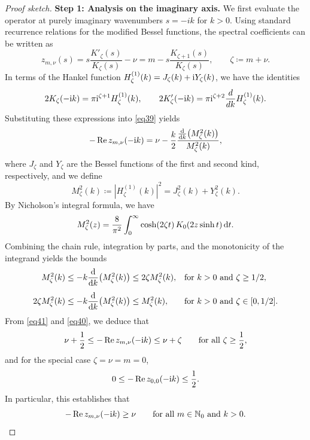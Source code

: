 \documentclass[12pt,reqno]{amsart}
\numberwithin{equation}{section}
\begin{document}
\begin{proof}[Proof sketch]
\smallskip\noindent\textbf{Step 1: Analysis on the imaginary axis.} 
We first evaluate the operator at purely imaginary wavenumbers $s = -ik$ for $k > 0$. Using standard recurrence relations for the modified Bessel functions, the spectral coefficients can be written as
\begin{equation}\label{eq39}
    z_{m,\nu}(s) = s \frac{K'_{\zeta}(s)}{K_{\zeta}(s)} - \nu
    = m - s \frac{K_{\zeta+1}(s)}{K_{\zeta}(s)}, \qquad \zeta \coloneqq m+\nu.
\end{equation}
In terms of the Hankel function $H_\zeta^{(1)}(k) = J_\zeta(k) + {\rm i}Y_\zeta(k)$, we have the identities
\begin{equation*}
    2K_\zeta(-{\rm i}k) = \pi {\rm i}^{\zeta+1} H_\zeta^{(1)}(k), \qquad
    2K'_\zeta(-{\rm i}k) = \pi {\rm i}^{\zeta+2} \frac{d}{dk} H_\zeta^{(1)}(k).
\end{equation*}
Substituting these expressions into \eqref{eq39} yields
\begin{equation}\label{eq41}
    - \operatorname{Re} z_{m,\nu}(- {\rm i}k)
    = \nu - \frac{k}{2} \frac{\frac{{\rm d}}{{\rm d}k} \bigl( M_\zeta^2(k) \bigr)}{M_\zeta^2(k)},
\end{equation}
where $J_\zeta$ and $Y_\zeta$ are the Bessel functions of the first and second kind, respectively, and we define
\begin{equation*}
    M_\zeta^2(k) \coloneqq |H_\zeta^{(1)}(k)|^2 = J_\zeta^2(k) + Y_\zeta^2(k).
\end{equation*}
By Nicholson's integral formula, we have
\begin{equation*}
    M_\zeta^2(z) = \frac{8}{\pi^2} \int_0^\infty \cosh(2\zeta t) \, K_0(2z\sinh t) \, {\rm d}t.
\end{equation*}
Combining the chain rule, integration by parts, and the monotonicity of the integrand yields the bounds
\begin{equation}\label{eq40}
\begin{aligned}
    M_\zeta^2(k) &\le -k \frac{{\rm d} }{{\rm d}k} \bigl( M_\zeta^2(k) \bigr) \le 2\zeta M_\zeta^2(k), && \text{for } k>0 \text{ and } \zeta \ge 1/2, \\[4pt]
    2\zeta M_\zeta^2(k) &\le -k \frac{{\rm d}}{{\rm d}k} \bigl( M_\zeta^2(k) \bigr) \le M_\zeta^2(k), && \text{for } k>0 \text{ and } \zeta \in [0, 1/2].
\end{aligned}
\end{equation}
From \eqref{eq41} and \eqref{eq40}, we deduce that
\begin{equation*}
    \nu + \frac{1}{2} \le - \operatorname{Re} z_{m,\nu}(-{\rm i}k) \le \nu + \zeta \qquad \text{for all } \zeta \ge \frac{1}{2},
\end{equation*}
and for the special case $\zeta = \nu = m = 0$,
\begin{equation*}
    0 \le - \operatorname{Re} z_{0,0}(-{\rm i}k) \le \frac{1}{2}.
\end{equation*}
In particular, this establishes that
\begin{equation*}
    - \operatorname{Re} z_{m,\nu}(-{\rm i}k) \ge \nu \qquad \text{for all } m \in \mathbb{N}_0 \text{ and } k > 0.
\end{equation*}



\end{proof}
\end{document}
